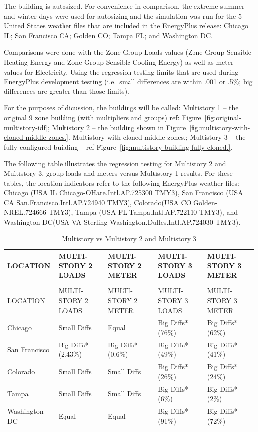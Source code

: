 The building is autosized. For convenience in comparison, the extreme summer and winter days were used for autosizing and the simulation was run for the 5 United States weather files that are included in the EnergyPlus release: Chicago IL; San Francisco CA; Golden CO; Tampa FL; and Washington DC.

Comparisons were done with the Zone Group Loads values (Zone Group Sensible Heating Energy and Zone Group Sensible Cooling Energy) as well as meter values for Electricity. Using the regression testing limits that are used during EnergyPlus development testing (i.e.~small differences are within .001 or .5\%; big differences are greater than those limits).

For the purposes of dicussion, the buildings will be called: Multistory 1 -- the original 9 zone building (with multipliers and groups) ref: Figure~\ref{fig:original-multistory-idf}; Multistory 2 -- the building shown in Figure~\ref{fig:multistory-with-cloned-middle-zones.}. Multistory with cloned middle zones.; Multistory 3 -- the fully configured building -- ref Figure~\ref{fig:multistory-building-fully-cloned.}.

The following table illustrates the regression testing for Multistory 2 and Multistory 3, group loads and meters versus Multistory 1 results.  For these tables, the location indicators refer to the following EnergyPlus weather files: Chicago (USA IL Chicago-OHare.Intl.AP.725300 TMY3), San Francisco (USA CA San.Francisco.Intl.AP.724940 TMY3), Colorado(USA CO Golden-NREL.724666 TMY3), Tampa (USA FL Tampa.Intl.AP.722110 TMY3), and Washington DC(USA VA Sterling-Washington.Dulles.Intl.AP.724030 TMY3).

\begin{longtable}[c]{p{1.2in}p{1.2in}p{1.2in}p{1.2in}p{1.2in}}
\caption{Multistory vs Multistory 2 and Multistory 3 \label{table:multistory-vs-multistory-2-and-multistory-3}} \tabularnewline
\toprule 
LOCATION & MULTI-STORY 2 LOADS & MULTI-STORY 2 METER & MULTI-STORY 3 LOADS & MULTI-STORY 3 METER \tabularnewline
\midrule
\endfirsthead

\caption[]{Multistory vs Multistory 2 and Multistory 3} \tabularnewline
\toprule 
LOCATION & MULTI-STORY 2 LOADS & MULTI-STORY 2 METER & MULTI-STORY 3 LOADS & MULTI-STORY 3 METER \tabularnewline
\midrule
\endhead

Chicago & Small Diffs & Equal & Big Diffs* (76\%) & Big Diffs* (62\%) \tabularnewline
San Francisco & Big Diffs* (2.43\%) & Big Diffs* (0.6\%) & Big Diffs* (49\%) & Big Diffs* (41\%) \tabularnewline
Colorado & Small Diffs & Small Diffs & Big Diffs* (26\%) & Big Diffs* (24\%) \tabularnewline
Tampa & Small Diffs & Small Diffs & Big Diffs* (6\%) & Big Diffs* (2\%) \tabularnewline
Washington DC & Equal & Equal & Big Diffs* (91\%) & Big Diffs* (72\%) \tabularnewline
\bottomrule
\end{longtable}


